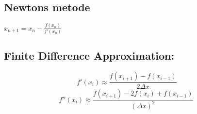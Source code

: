 \documentclass[a4paper,7pt,fleqn]{article}
\begin{document}
\begin{multicols}{2}
\subsection{Newtons metode}  

\( x_{n+1} = x_n - \frac{f(x_n)}{f'(x_n)} \)  

\subsection{Finite Difference Approximation:}
\[
\ f'(x_i) \approx  \frac{f(x_{i+1}) - f(x_{i-1})}{2\Delta x}
\]
\[
f''(x_i) \approx  \frac{f(x_{i+1}) - 2f(x_i) + f(x_{i-1})}{(\Delta x)^2}
\]

\end{multicols}





\newpage
\end{document}
